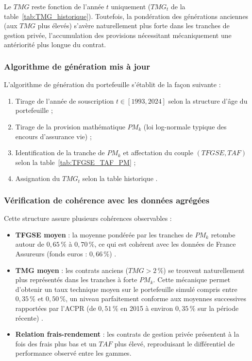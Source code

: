 Le $TMG$ reste fonction de l'année $t$ uniquement ($TMG_t$ de la table~\ref{tab:TMG_historique}). Toutefois, la pondération des générations anciennes (aux $TMG$ plus élevés) s'avère naturellement plus forte dans les tranches de gestion privée, l'accumulation des provisions nécessitant mécaniquement une antériorité plus longue du contrat.

\subsubsection*{Algorithme de génération mis à jour}

L'algorithme de génération du portefeuille s'établit de la façon suivante :
\begin{enumerate}
  \item Tirage de l'année de souscription $t \in [1993,2024]$ selon la structure d'âge du portefeuille ;
  \item Tirage de la provision mathématique $PM_k$ (loi log-normale typique des encours d'assurance vie) ;
  \item Identification de la tranche de $PM_k$ et affectation du couple $(TFGSE, TAF)$ selon la table~\ref{tab:TFGSE_TAF_PM} ;
  \item Assignation du $TMG_t$ selon la table historique .
\end{enumerate}

\subsubsection*{Vérification de cohérence avec les données agrégées}

Cette structure assure plusieurs cohérences observables :
\begin{itemize}
  \item \textbf{TFGSE moyen} : la moyenne pondérée par les tranches de $PM_k$ retombe autour de $0{,}65\,\%$ à $0{,}70\,\%$, ce qui est cohérent avec les données de France Assureurs (fonds euros : $0{,}66\,\%$) \cite{faUC2024}.
  \item \textbf{TMG moyen} : les contrats anciens ($TMG > 2\,\%$) se trouvent naturellement plus représentés dans les tranches à forte $PM_k$. Cette mécanique permet d'obtenir un taux technique moyen sur le portefeuille simulé compris entre $0{,}35\,\%$ et $0{,}50\,\%$, un niveau parfaitement conforme aux moyennes successives rapportées par l'ACPR (de $0{,}51\,\%$ en 2015 à environ $0{,}35\,\%$ sur la période récente) \cite{acprTauxBas, acprRevalo2024}.
  \item \textbf{Relation frais-rendement} : les contrats de gestion privée présentent à la fois des frais plus bas et un $TAF$ plus élevé, reproduisant le différentiel de performance observé entre les gammes.
\end{itemize}

